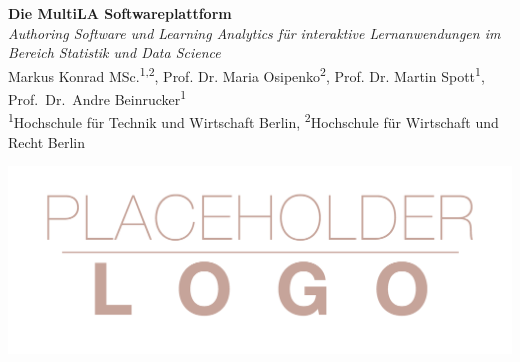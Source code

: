 \documentclass[a0,portrait]{a0poster}
\begin{document}


\begin{minipage}[b]{0.75\linewidth}
\veryHuge \color{NavyBlue} \textbf{Die MultiLA Softwareplattform} \color{Black}\\ %
\Huge\textit{Authoring Software und Learning Analytics für interaktive Lernanwendungen im Bereich Statistik und Data Science}\\[2cm] %
\huge Markus Konrad MSc.\textsuperscript{1,2},
Prof. Dr. Maria Osipenko\textsuperscript{2},
Prof. Dr. Martin Spott\textsuperscript{1},
Prof.~Dr.~Andre Beinrucker\textsuperscript{1}\\[0.5cm] %
\large \textsuperscript{1}Hochschule für Technik und Wirtschaft Berlin, \textsuperscript{2}Hochschule für Wirtschaft und Recht Berlin\\[0.4cm] %
\end{minipage}
%
\begin{minipage}[b]{0.25\linewidth}
\includegraphics[width=20cm]{logo.png}\\
\end{minipage}

\vspace{1cm} %

\end{document}
